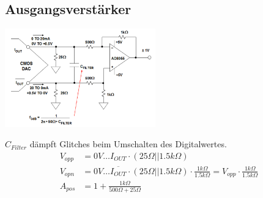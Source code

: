 \subsection{Ausgangsverstärker}
\begin{minipage}{7cm}
	\includegraphics[width=6.5cm]{pictures/Ausgangsverstaerker.png}
\end{minipage}
\begin{minipage}{12cm}
  $C_{Filter}$ dämpft Glitches beim Umschalten des Digitalwertes.
  \begin{align*}
  	V_{opp} &= 0V \hdots I_{OUT} \cdot (25\Omega || 1.5k\Omega) \\
  	V_{opn} &= 0V \hdots \overline{I_{OUT}} \cdot (25\Omega || 1.5k\Omega) \cdot \frac{1k\Omega}{1.5k\Omega} = V_{opp} \cdot \frac{1k\Omega}{1.5k\Omega} \\
  	A_{pos} &= 1 + \frac{1k\Omega}{500\Omega + 25\Omega}
  \end{align*}
\end{minipage}

